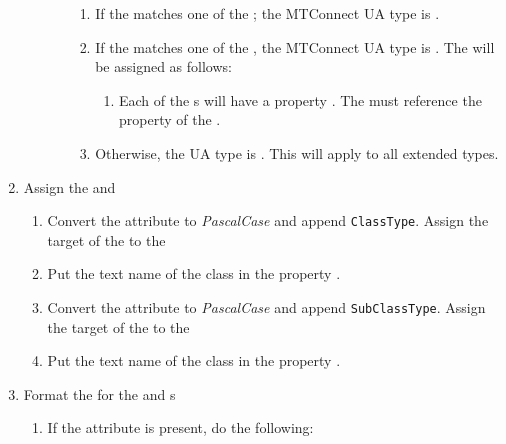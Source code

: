 \begin{enumerate}
\begin{itemize}
\begin{enumerate}
\begin{enumerate}
            \item If the  matches one of the ; the MTConnect UA type is .
            \item If the  matches one of the  , the MTConnect UA type is . The  will be assigned as follows:
                \begin{enumerate}
                \item Each of the s will have a property . The  must reference the  property of the .
                \end{enumerate}
            \item Otherwise, the UA type is . This will apply to all extended types.
            \end{enumerate}
        \end{enumerate}
    \end{itemize}
\item Assign the  and  
    \begin{enumerate}
        \item Convert the   attribute to \textit{PascalCase} and append \texttt{ClassType}. Assign the target of the  to the 
        \item Put the text name of the class in the property .
        \item Convert the   attribute to \textit{PascalCase} and append \texttt{SubClassType}. Assign the target of the  to the 
        \item Put the text name of the class in the property .
    \end{enumerate}
\item Format the  for the  and  s
    \begin{enumerate}
    \item If the  attribute  is present, do the following:
        \begin{enumerate}

\end{enumerate}
\end{enumerate}
\end{enumerate}
